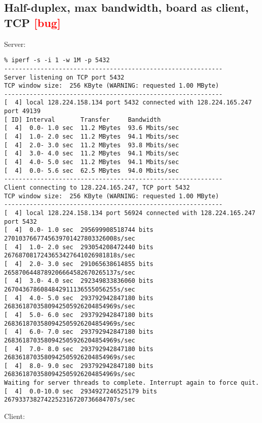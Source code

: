 \documentclass[a4paper]{report}
\begin{document}
\subsection{Half-duplex, max bandwidth, board as client, TCP \textcolor{red}{[bug]}}
Server:
\begin{lstlisting}
% iperf -s -i 1 -w 1M -p 5432
------------------------------------------------------------
Server listening on TCP port 5432
TCP window size:  256 KByte (WARNING: requested 1.00 MByte)
------------------------------------------------------------
[  4] local 128.224.158.134 port 5432 connected with 128.224.165.247 port 49139
[ ID] Interval       Transfer     Bandwidth
[  4]  0.0- 1.0 sec  11.2 MBytes  93.6 Mbits/sec
[  4]  1.0- 2.0 sec  11.2 MBytes  94.1 Mbits/sec
[  4]  2.0- 3.0 sec  11.2 MBytes  93.8 Mbits/sec
[  4]  3.0- 4.0 sec  11.2 MBytes  94.1 Mbits/sec
[  4]  4.0- 5.0 sec  11.2 MBytes  94.1 Mbits/sec
[  4]  0.0- 5.6 sec  62.5 MBytes  94.0 Mbits/sec
------------------------------------------------------------
Client connecting to 128.224.165.247, TCP port 5432
TCP window size:  256 KByte (WARNING: requested 1.00 MByte)
------------------------------------------------------------
[  4] local 128.224.158.134 port 56924 connected with 128.224.165.247 port 5432
[  4]  0.0- 1.0 sec  295699908518744 bits  2701037667745639701427803326008s/sec
[  4]  1.0- 2.0 sec  293054208472440 bits  2676870817243653427641026981818s/sec
[  4]  2.0- 3.0 sec  291065638614855 bits  2658706448789206664582670265137s/sec
[  4]  3.0- 4.0 sec  292349833836060 bits  2670436786084842911136555056255s/sec
[  4]  4.0- 5.0 sec  293792942847180 bits  2683618703580942505926204854969s/sec
[  4]  5.0- 6.0 sec  293792942847180 bits  2683618703580942505926204854969s/sec
[  4]  6.0- 7.0 sec  293792942847180 bits  2683618703580942505926204854969s/sec
[  4]  7.0- 8.0 sec  293792942847180 bits  2683618703580942505926204854969s/sec
[  4]  8.0- 9.0 sec  293792942847180 bits  2683618703580942505926204854969s/sec
Waiting for server threads to complete. Interrupt again to force quit.
[  4]  0.0-10.0 sec  2934927246525179 bits  2679337382742252316720736684707s/sec
\end{lstlisting}
Client:
\end{document}

